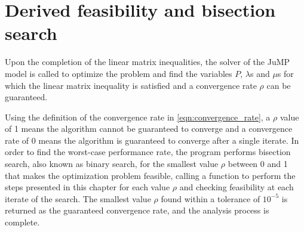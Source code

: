 \section{Derived feasibility and bisection search}
Upon the completion of the linear matrix inequalities, the solver of the JuMP model is called to optimize the problem and find the variables \texttt{$P$}, \texttt{$\lambda$}s and \texttt{$\mu$}s for which the linear matrix inequality is satisfied and a convergence rate $\rho$ can be guaranteed.

Using the definition of the convergence rate in \eqref{eqn:convergence_rate}, a \texttt{$\rho$} value of 1 means the algorithm cannot be guaranteed to converge and a convergence rate of 0 means the algorithm is guaranteed to converge after a single iterate. In order to find the worst-case performance rate, the program performs bisection search, also known as binary search, for the smallest value $\rho$ between 0 and 1 that makes the optimization problem feasible, calling a function to perform the steps presented in this chapter for each value \texttt{$\rho$} and checking feasibility at each iterate of the search. The smallest value \texttt{$\rho$} found within a tolerance of $10^{-5}$ is returned as the guaranteed convergence rate, and the analysis process is complete.